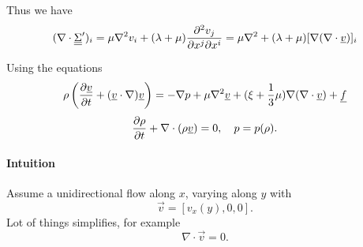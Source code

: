\documentclass[../main.tex]{subfiles}
\begin{document}
  Thus we have
  \begin{displaymath}
    (\nabla\cdot \underline{\underline{{\Sigma}}}')_i = \mu \nabla^2 v_i + (\lambda + \mu) \frac{\partial^2 v_j}{\partial x^j \partial x^i} 
    = \mu \nabla^2 + (\lambda + \mu) [\nabla (\nabla \cdot \underline{v})]_i
  \end{displaymath}

  Using the equations
  \begin{displaymath}
    \rho \left( \frac{\partial \underline{v}}{\partial t} + (\underline{v} \cdot \nabla) \underline{v} \right) 
    = - \nabla p + \mu \nabla^2 \underline{v} + (\xi + \frac{1}{3} \mu) \nabla (\nabla \cdot \underline{v}) + \underline{f}
  \end{displaymath}
  \begin{displaymath}
    \frac{\partial \rho}{\partial t} + \nabla \cdot (\rho \underline{v}) = 0, \quad p = p(\rho).
  \end{displaymath}

  \paragraph{Intuition}
  Assume a unidirectional flow along $x$, varying along $y$ with
  \begin{displaymath}
    \vec v = [v_x(y), 0, 0].
  \end{displaymath}
  Lot of things simplifies, for example
  \begin{displaymath}
    \nabla \cdot \vec v = 0.
  \end{displaymath}
  
\end{document}
